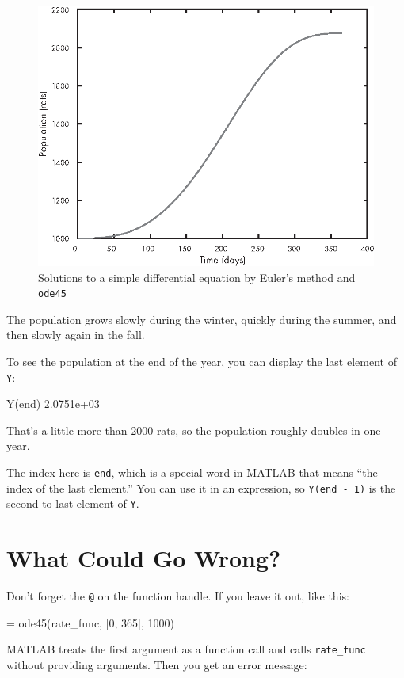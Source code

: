 \begin{figure}[ht]
\includegraphics{book/images/figure09_03_new.eps}
\caption{Solutions to a simple differential equation by Euler's method and \lstinline{ode45}}
\label{fig:rats}
\end{figure}

The population grows slowly during the winter, quickly during the summer, and then slowly again in the fall.

To see the population at the end of the year, you can display the last element of \lstinline{Y}:

\begin{code}
Y(end)
2.0751e+03
\end{code}

That's a little more than 2000 rats, so the population roughly doubles in one year.

The index here is \lstinline{end}, which is a special word in MATLAB that means ``the index of the last element.''  You can use it in an expression, so \lstinline{Y(end - 1)} is the second-to-last element of
\lstinline{Y}.



\section{What Could Go Wrong?}

Don't forget the \lstinline{@} on the function handle.
If you leave it out, like this:

\begin{code}
[T, Y] = ode45(rate_func, [0, 365], 1000)
\end{code}
MATLAB treats the first argument as a function
call and calls \lstinline{rate_func} without providing arguments.
Then you get an error message:


